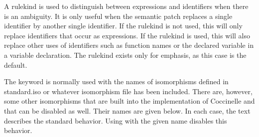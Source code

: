 \begin{grammar}








\end{grammar}

A rulekind is used to distinguish between expressions and identifiers when
there is an ambiguity.  It is only useful when the semantic patch replaces
a single identifier by another single identifier.  If the rulekind
 is not used, this will only replace identifiers that occur
as expressions.  If the rulekind  is used, this will also
replace other uses of identifiers such as function names or the declared
variable in a variable declaration.  The rulekind  exists
only for emphasis, as this case is the default.

The keyword  is normally used with the names of
isomorphisms defined in standard.iso or whatever isomorphism file has been
included.  There are, however, some other isomorphisms that are built into
the implementation of Coccinelle and that can be disabled as well.  Their
names are given below.  In each case, the text describes the standard
behavior.  Using  with the given name disables this behavior.

